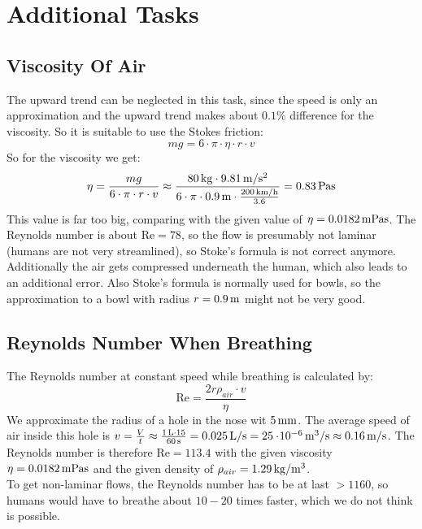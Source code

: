 \section{Additional Tasks}
\subsection{Viscosity Of Air}
The upward trend can be neglected in this task, since the speed is only an approximation and the upward trend makes about $0.1\%$ difference for the viscosity. So it is suitable to use the Stokes friction:
\begin{equation*}
mg = 6 \cdot \pi \cdot \eta \cdot r \cdot v
\end{equation*}
So for the viscosity we get:
\begin{equation}
\eta = \frac{mg}{6 \cdot \pi \cdot r \cdot v} \approx \frac{\unit[80]{kg}\cdot \unit[9.81]{m/s^2}}{6 \cdot \pi \cdot \unit[0.9]{m} \cdot \frac{\unit[200]{km/h}}{3.6}} = \unit[0.83]{Pa s}
\end{equation}
This value is far too big, comparing with the given value of $\eta = \unit[0.0182]{mPa s}$. The Reynolds number is about $\text{Re} = 78$, so the flow is presumably not laminar (humans are not very streamlined), so Stoke's formula is not correct anymore. Additionally the air gets compressed underneath the human, which also leads to an additional error. Also Stoke's formula is normally used for bowls, so the approximation to a bowl with radius $r = \unit[0.9]{m}$ might not be very good.

\subsection{Reynolds Number When Breathing}
The Reynolds number at constant speed while breathing is calculated by:
\begin{equation}
\text{Re} = \frac{2r \rho_{air} \cdot v}{\eta}
\end{equation}
We approximate the radius of a hole in the nose wit $\unit[5]{mm}$. The average speed of air inside this hole is $v = \frac{V}{t} \approx \frac{\unit[1]{L} \cdot 15}{\unit[60]{s}} = \unit[0.025]{L/s} = \unit[25\e{-6}]{m^3/s} \approx \unit[0.16]{m/s}$. The Reynolds number is therefore $\text{Re} = 113.4$ with the given viscosity $\eta = \unit[0.0182]{mPa s}$ and the given density of $\rho_{air} = \unit[1.29]{kg/m^3}$.\\
To get non-laminar flows, the Reynolds number has to be at last $>1160$, so humans would have to breathe about $10-20$ times faster, which we do not think is possible.